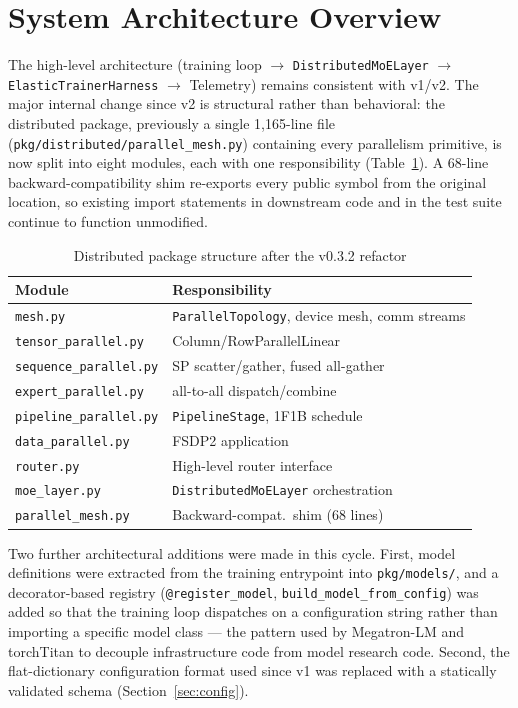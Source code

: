 \documentclass[11pt]{article}
\begin{document}
\section{System Architecture Overview}

The high-level architecture (training loop $\rightarrow$
\texttt{DistributedMoELayer} $\rightarrow$ \texttt{ElasticTrainerHarness}
$\rightarrow$ Telemetry) remains consistent with v1/v2. The major internal
change since v2 is structural rather than behavioral: the distributed
package, previously a single 1{,}165-line file
(\texttt{pkg/distributed/parallel\_mesh.py}) containing every parallelism
primitive, is now split into eight modules, each with one responsibility
(Table~\ref{tab:modules}). A 68-line backward-compatibility shim re-exports
every public symbol from the original location, so existing import
statements in downstream code and in the test suite continue to function
unmodified.

\begin{table}[h]
\centering
\small
\caption{Distributed package structure after the v0.3.2 refactor}
\label{tab:modules}
\begin{tabular}{@{}ll@{}}
\toprule
\textbf{Module} & \textbf{Responsibility} \\
\midrule
\texttt{mesh.py} & \texttt{ParallelTopology}, device mesh, comm streams \\
\texttt{tensor\_parallel.py} & Column/RowParallelLinear \\
\texttt{sequence\_parallel.py} & SP scatter/gather, fused all-gather \\
\texttt{expert\_parallel.py} & all-to-all dispatch/combine \\
\texttt{pipeline\_parallel.py} & \texttt{PipelineStage}, 1F1B schedule \\
\texttt{data\_parallel.py} & FSDP2 application \\
\texttt{router.py} & High-level router interface \\
\texttt{moe\_layer.py} & \texttt{DistributedMoELayer} orchestration \\
\texttt{parallel\_mesh.py} & Backward-compat.\ shim (68 lines) \\
\bottomrule
\end{tabular}
\end{table}

Two further architectural additions were made in this cycle. First, model
definitions were extracted from the training entrypoint into
\texttt{pkg/models/}, and a decorator-based registry
(\texttt{@register\_model}, \texttt{build\_model\_from\_config}) was added
so that the training loop dispatches on a configuration string rather than
importing a specific model class --- the pattern used by Megatron-LM and
torchTitan to decouple infrastructure code from model research code.
Second, the flat-dictionary configuration format used since v1 was replaced
with a statically validated schema (Section~\ref{sec:config}).
\end{document}
